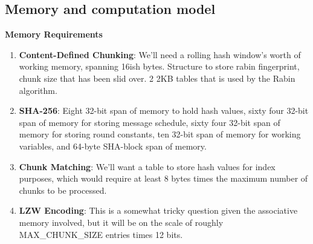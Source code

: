 \documentclass{article}
\begin{document}
\subsection{Memory and computation model}
\item%
\textbf{Memory Requirements}
\begin{enumerate}[label=(\roman*)]
\item%
\textbf{Content-Defined Chunking}:\newline
We'll need a rolling hash window's worth of working memory, spanning 16ish bytes.
Structure to store rabin fingerprint, chunk size that has been slid over.
2 2KB tables that is used by the Rabin algorithm.
\item%
\textbf{SHA-256}:\newline
Eight 32-bit span of memory to hold hash values, 
sixty four 32-bit span of memory for storing message schedule,
sixty four 32-bit span of memory for storing round constants,
ten 32-bit span of memory for working variables, and
64-byte SHA-block span of memory.

\item%
\textbf{Chunk Matching}:\newline
We'll want a table to store hash values for index purposes, which would require at least 8 bytes times the maximum number of chunks to be processed.

\item%
\textbf{LZW Encoding}:\newline
This is a somewhat tricky question given the associative memory involved, but it will be on the scale of roughly MAX\_CHUNK\_SIZE entries times 12 bits.

\end{enumerate}%
\end{document}
